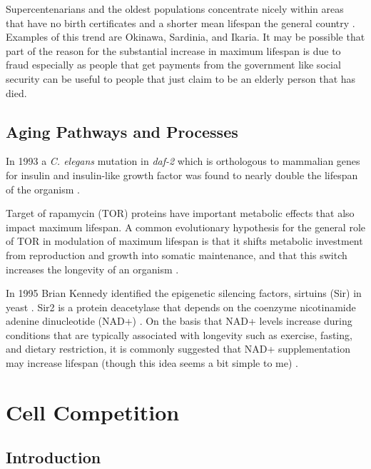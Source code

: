 \documentclass[]{book}
\begin{document}
Supercentenarians and the oldest populations concentrate nicely within areas that have no birth certificates and a shorter mean lifespan the general country \citep{Newman2019-zs}. Examples of this trend are Okinawa, Sardinia, and Ikaria. It may be possible that part of the reason for the substantial increase in maximum lifespan is due to fraud especially as people that get payments from the government like social security can be useful to people that just claim to be an elderly person that has died.

\hypertarget{aging-pathways-and-processes}{%
\section{Aging Pathways and Processes}\label{aging-pathways-and-processes}}

In 1993 a \emph{C. elegans} mutation in \emph{daf-2} which is orthologous to mammalian genes for insulin and insulin-like growth factor was found to nearly double the lifespan of the organism \citep{kenyon1993c}.

Target of rapamycin (TOR) proteins have important metabolic effects that also impact maximum lifespan. A common evolutionary hypothesis for the general role of TOR in modulation of maximum lifespan is that it shifts metabolic investment from reproduction and growth into somatic maintenance, and that this switch increases the longevity of an organism \citep{kapahi2010tor}.

In 1995 Brian Kennedy identified the epigenetic silencing factors, sirtuins (Sir) in yeast \citep{kennedy1995mutation}. Sir2 is a protein deacetylase that depends on the coenzyme nicotinamide adenine dinucleotide (NAD+) \citep{imai2000transcriptional}. On the basis that NAD+ levels increase during conditions that are typically associated with longevity such as exercise, fasting, and dietary restriction, it is commonly suggested that NAD+ supplementation may increase lifespan (though this idea seems a bit simple to me) \citep{mouchiroud2013nad}.

\hypertarget{competition}{%
\chapter{Cell Competition}\label{competition}}

\hypertarget{introduction-3}{%
\section{Introduction}\label{introduction-3}}
\end{document}
